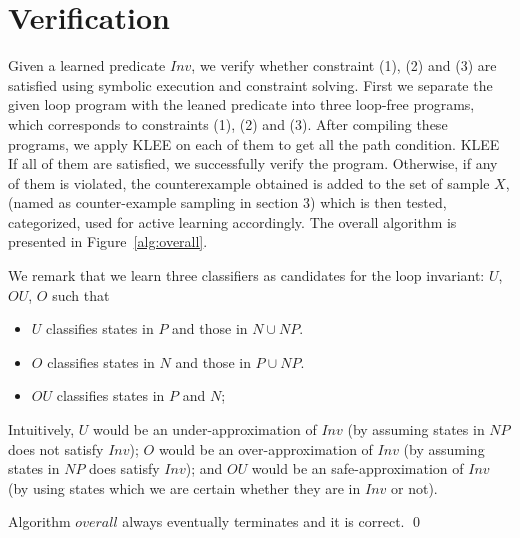 
\section{Verification}
Given a learned predicate $Inv$, we verify whether constraint (1), (2) and (3) are satisfied using symbolic execution and constraint solving.
First we separate the given loop program with the leaned predicate into three loop-free programs,
which corresponds to constraints (1), (2) and (3). 
After compiling these programs, we apply KLEE on each of them to get all the path condition.
KLEE 
If all of them are satisfied, we successfully verify the program. 
Otherwise, if any of them is violated, the counterexample obtained is added to the set of sample $X$, (named as counter-example sampling in section 3)
 which is then tested, categorized, used for active learning accordingly. 
 The overall algorithm is presented in Figure~\ref{alg:overall}.

We remark that we learn three classifiers as candidates for the loop invariant: $U$, $OU$, $O$ such that
\begin{itemize}
\item $U$ classifies states in $P$ and those in $N \cup NP$.
\item $O$ classifies states in $N$ and those in $P \cup NP$.
\item $OU$ classifies states in $P$ and $N$;
\end{itemize}
Intuitively, $U$ would be an under-approximation of $Inv$ (by assuming states in $NP$ does not satisfy $Inv$); 
$O$ would be an over-approximation of $Inv$ (by assuming states in $NP$ does satisfy $Inv$); 
and $OU$ would be an safe-approximation of $Inv$ (by using states which we are certain whether they are in $Inv$ or not).
\begin{example}
\end{example}


\begin{theorem}
Algorithm $overall$ always eventually terminates and it is correct. \hfill \qed
\end{theorem}
